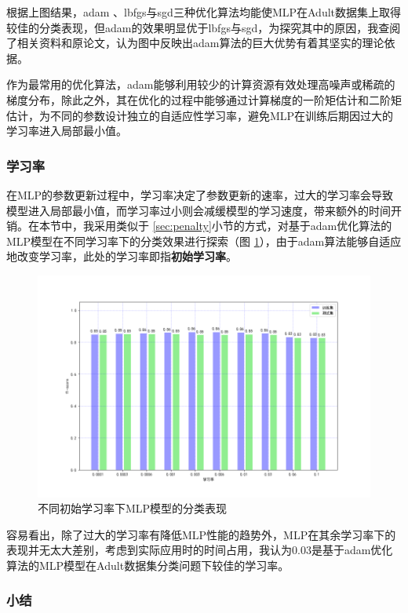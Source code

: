 \documentclass[12pt,a4paper]{article}
\theoremstyle{definition}
\begin{document}
根据上图结果，adam \cite{adam}、lbfgs与sgd三种优化算法均能使MLP在Adult数据集上取得较佳的分类表现，但adam的效果明显优于lbfgs与sgd，为探究其中的原因，我查阅了相关资料和原论文，认为图中反映出adam算法的巨大优势有着其坚实的理论依据。

\vspace{0.01\linewidth}
作为最常用的优化算法，adam能够利用较少的计算资源有效处理高噪声或稀疏的梯度分布，除此之外，其在优化的过程中能够通过计算梯度的一阶矩估计和二阶矩估计，为不同的参数设计独立的自适应性学习率，避免MLP在训练后期因过大的学习率进入局部最小值。

\subsubsection{学习率}

在MLP的参数更新过程中，学习率决定了参数更新的速率，过大的学习率会导致模型进入局部最小值，而学习率过小则会减缓模型的学习速度，带来额外的时间开销。在本节中，我采用类似于 \ref{sec:penalty}小节的方式，对基于adam优化算法的MLP模型在不同学习率下的分类效果进行探索（图 \ref{fig:lr}），由于adam算法能够自适应地改变学习率，此处的学习率即指\textbf{初始学习率}。

\begin{figure}[H]
	\centering
	\includegraphics[width=0.75\linewidth]{img/mlp_lr.png}
	\caption{不同初始学习率下MLP模型的分类表现}
	\label{fig:lr}
\end{figure}

容易看出，除了过大的学习率有降低MLP性能的趋势外，MLP在其余学习率下的表现并无太大差别，考虑到实际应用时的时间占用，我认为0.03是基于adam优化算法的MLP模型在Adult数据集分类问题下较佳的学习率。

\subsubsection{小结}
\end{document}
